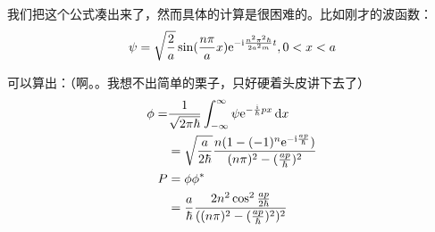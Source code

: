 我们把这个公式凑出来了，然而具体的计算是很困难的。比如刚才的波函数：
\begin{equation*}
\psi=\sqrt{\frac{2}{a}} \sin(\frac{n \pi}{a} x) \mathrm{e}^{-\mathrm{i} \frac{n^2 \pi^2 \hbar}{2 a^2 m} t}, 0<x<a
\end{equation*}

可以算出：（啊。。我想不出简单的栗子，只好硬着头皮讲下去了）
\begin{align*}
\phi=&\frac{1}{\sqrt{2 \pi \hbar}} \int_{-\infty}^{\infty} \psi \mathrm{e}^{-\frac{\mathrm{i}}{\hbar} p x} \mathop{}\!\mathrm{d} x \\
&=\sqrt{\frac{a}{2 \hbar}} \frac{n (1-(-1)^n \mathrm{e}^{-\mathrm{i} \frac{a p}{\hbar}})}{(n \pi)^2-(\frac{a p}{\hbar})^2} \\
P&=\phi \phi^* \\
&=\frac{a}{\hbar} \frac{2 n^2 \cos^2 \frac{a p}{2 \hbar}}{((n \pi)^2-(\frac{a p}{\hbar})^2)^2}
\end{align*}


